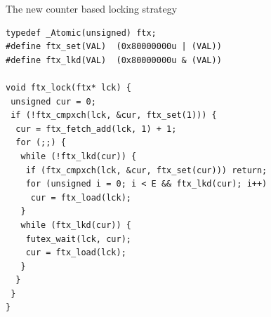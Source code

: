 \documentclass[xetex,final,10pt]{beamer}
\begin{document}
\begin{frame}[fragile]
\begin{center}
\begin{columns}[t]
\begin{column}{0.48\textwidth}
\begin{myblock}{The new counter based locking strategy}
\begin{lstlisting}
typedef _Atomic(unsigned) ftx;
#define ftx_set(VAL)  (0x80000000u | (VAL))
#define ftx_lkd(VAL)  (0x80000000u & (VAL))

void ftx_lock(ftx* lck) {
 unsigned cur = 0;
 if (!ftx_cmpxch(lck, &cur, ftx_set(1))) {
  cur = ftx_fetch_add(lck, 1) + 1;
  for (;;) {
   while (!ftx_lkd(cur)) {
    if (ftx_cmpxch(lck, &cur, ftx_set(cur))) return;
    for (unsigned i = 0; i < E && ftx_lkd(cur); i++)
     cur = ftx_load(lck);
   }
   while (ftx_lkd(cur)) {
    futex_wait(lck, cur);
    cur = ftx_load(lck);
   }
  }
 }
}
\end{lstlisting}
\end{myblock}
\skipper

\skipper

\skipper


        \end{column}

    \end{columns}
\end{center}
\end{frame}
\end{document}
